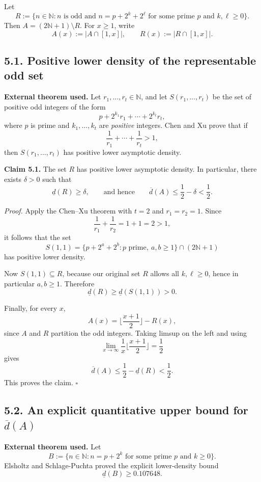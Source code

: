 Let
\[
R:=\{n\in\mathbb N: n\text{ is odd and }n=p+2^k+2^\ell\text{ for some prime }p\text{ and }k,\ell\ge 0\}.
\]
Then $A=(2\mathbb N+1)\setminus R$. For $x\ge 1$, write
\[
A(x):=|A\cap[1,x]|,\qquad R(x):=|R\cap[1,x]|.
\]

\subsection*{5.1. Positive lower density of the representable odd set}

\noindent\textbf{External theorem used.}
Let $r_1,\dots,r_t\in\mathbb N$, and let $S(r_1,\dots,r_t)$ be the set of positive odd integers of the form
\[
p+2^{k_1}r_1+\cdots+2^{k_t}r_t,
\]
where $p$ is prime and $k_1,\dots,k_t$ are \emph{positive} integers. Chen and Xu prove that if
\[
\frac1{r_1}+\cdots+\frac1{r_t}>1,
\]
then $S(r_1,\dots,r_t)$ has positive lower asymptotic density.

\medskip
\noindent\textbf{Claim 5.1.}
The set $R$ has positive lower asymptotic density. In particular, there exists $\delta>0$ such that
\[
\underline d(R)\ge \delta,
\qquad\text{and hence}\qquad
\overline d(A)\le \frac12-\delta<\frac12.
\]

\noindent\emph{Proof.}
Apply the Chen--Xu theorem with $t=2$ and $r_1=r_2=1$. Since
\[
\frac1{r_1}+\frac1{r_2}=1+1=2>1,
\]
it follows that the set
\[
S(1,1)=\{p+2^a+2^b: p\text{ prime},\ a,b\ge 1\}\cap(2\mathbb N+1)
\]
has positive lower density.

Now $S(1,1)\subseteq R$, because our original set $R$ allows all $k,\ell\ge 0$, hence in particular $a,b\ge 1$. Therefore
\[
\underline d(R)\ge \underline d(S(1,1))>0.
\]

Finally, for every $x$,
\[
A(x)=\Big\lfloor\frac{x+1}{2}\Big\rfloor-R(x),
\]
since $A$ and $R$ partition the odd integers. Taking limsup on the left and using
\[
\lim_{x\to\infty}\frac1x\Big\lfloor\frac{x+1}{2}\Big\rfloor=\frac12
\]
gives
\[
\overline d(A)\le \frac12-\underline d(R)<\frac12.
\]
This proves the claim. \hfill$\square$

\subsection*{5.2. An explicit quantitative upper bound for $\overline d(A)$}

\noindent\textbf{External theorem used.}
Let
\[
B:=\{n\in\mathbb N: n=p+2^k\text{ for some prime }p\text{ and }k\ge 0\}.
\]
Elsholtz and Schlage-Puchta proved the explicit lower-density bound
\[
\underline d(B)\ge 0.107648.
\]

